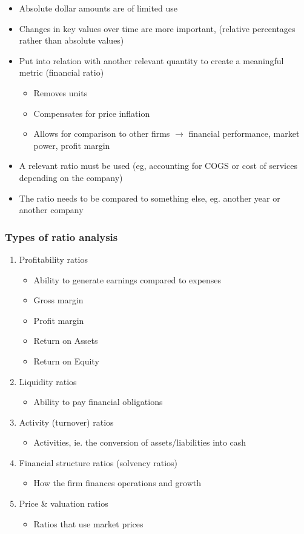 \documentclass{article}
\begin{document}
		\begin{itemize}
			\item Absolute dollar amounts are of limited use
			\item Changes in key values over time are more important, (relative percentages rather than absolute values)
			\item Put into relation with another relevant quantity to create a meaningful metric (financial ratio)
				\begin{itemize}
					\item Removes units
					\item Compensates for price inflation
					\item Allows for comparison to other firms $\rightarrow$ financial performance, market power, profit margin
				\end{itemize}
			\item A relevant ratio must be used (eg, accounting for COGS or cost of services depending on the company)
			\item The ratio needs to be compared to something else, eg. another year or another company
		\end{itemize}

		\subsubsection{Types of ratio analysis}

			\begin{enumerate}
				\item Profitability ratios
					\begin{itemize}
						\item Ability to generate earnings compared to expenses
						\item Gross margin
						\item Profit margin
						\item Return on Assets
						\item Return on Equity
					\end{itemize}
				\item Liquidity ratios
					\begin{itemize}
						\item Ability to pay financial obligations
					\end{itemize}
				\item Activity (turnover) ratios
					\begin{itemize}
						\item Activities, ie. the conversion of assets/liabilities into cash
					\end{itemize}
				\item Financial structure ratios (solvency ratios)
					\begin{itemize}
						\item How the firm finances operations and growth
					\end{itemize}
				\item Price & valuation ratios
					\begin{itemize}
						\item Ratios that use market prices
					\end{itemize}
			\end{enumerate}
\end{document}
